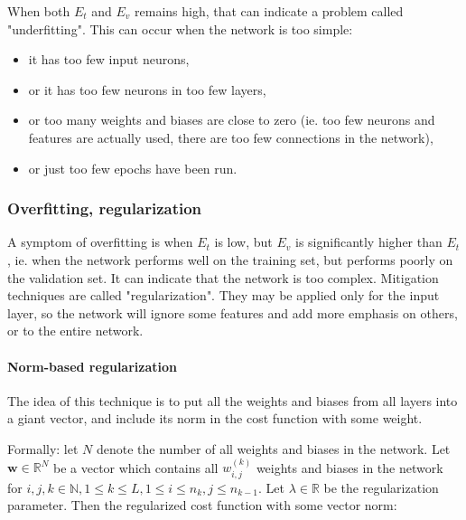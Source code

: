 \documentclass[titlepage]{article}
\begin{document}
        When both $E_t$ and $E_v$ remains high, that can indicate a problem
        called "underfitting". This can occur when the network is too simple:

        \begin{itemize}
          \item it has too few input neurons,

          \item or it has too few neurons in too few layers,

          \item or too many weights and biases are close to zero (ie. too few
                neurons and features are actually used, there are too few
                connections in the network),

          \item or just too few epochs have been run.
        \end{itemize}

      \subsubsection{Overfitting, regularization}

        A symptom of overfitting is when $E_t$ is low, but $E_v$ is
        significantly higher than $E_t$, ie. when the network performs well on
        the training set, but performs poorly on the validation set. It can
        indicate that the network is too complex. Mitigation techniques are
        called "regularization". They may be applied only for the input layer,
        so the network will ignore some features and add more emphasis on
        others, or to the entire network.

        \paragraph{Norm-based regularization}

          The idea of this technique is to put all the weights and biases from
          all layers into a giant vector, and include its norm in the cost
          function with some weight.

          Formally: let $N$ denote the number of all weights and biases in the
          network. Let $\mathbf{w} \in \mathbb{R}^N$ be a vector which contains
          all $w_{i,j}^{(k)}$ weights and biases in the network for
          $i, j, k \in \mathbb{N}, 1 \leq k \leq L, 1 \leq i \leq n_k, j \leq n_{k-1}$.
          Let $\lambda \in \mathbb{R}$ be the regularization parameter. Then
          the regularized cost function with some vector norm:
\end{document}
